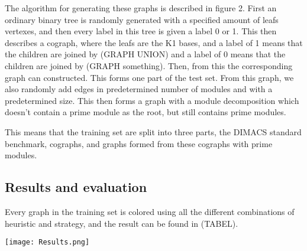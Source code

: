 \documentclass{amsart}
\begin{document}
The algorithm for generating these graphs is described in figure 2. First an
ordinary binary tree is randomly generated with a specified amount of leafs
vertexes, and then every label in this tree is given a label 0 or 1.  This then
describes a cograph, where the leafs are the K1 bases, and a label of 1 means
that the children are joined by (GRAPH UNION) and a label of 0 means that the
children are joined by (GRAPH something). Then, from this the corresponding
graph can constructed. This forms one part of the test set. From this graph, we
also randomly add edges in predetermined number of modules and with a
predetermined size. This then forms a graph with a module decomposition which
doesn't contain a prime module as the root, but still contains prime modules.

This means that the training set are split into three parts, the DIMACS standard
benchmark, cographs, and graphs formed from these cographs with prime modules.

\subsection{Results and evaluation}

Every graph in the training set is colored using all the different combinations
of heuristic and strategy, and the result can be found in (TABEL).

\texttt{[image: Results.png]}
\end{document}
